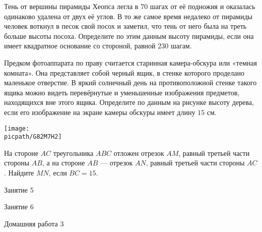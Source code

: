 \begin{homework}[number=2]
	\begin{listofex}
		\item Тень от вершины пирамиды Хеопса легла	в \( 70 \) шагах от её подножия и оказалась	одинаково удалена от двух её углов. В то же самое время недалеко от пирамиды человек воткнул в песок свой посох и	заметил, что тень от него была на треть	больше высоты посоха. Определите по	этим данным высоту пирамиды, если она имеет квадратное основание со стороной, равной \( 230 \) шагам.
		\item Предком фотоаппарата по праву считается старинная камера-обскура или «темная комната». Она представляет собой черный ящик, в стенке которого проделано маленькое отверстие. В яркий солнечный
		день на противоположной стенке такого ящика можно видеть перевёрнутые и	уменьшенные изображения предметов, находящихся вне этого ящика. Определите по данным на рисунке высоту дерева, если его изображение на экране камеры обскуры имеет длину \( 15 \) см.
		\begin{center}
			\texttt{[image: \\picpath/G82M7H2]}
		\end{center}
		\item На стороне \( AC \) треугольника \( ABC \) отложен отрезок \( AM \), равный третьей части стороны \( AB \), а на стороне \( AB \) --- отрезок \( AN \), равный третьей части стороны \( AC \). Найдите \( MN \), если \( BC=15 \).
	\end{listofex}
\end{homework}

\begin{class}[number=5]
	\begin{listofex}
		\item Занятие 5
	\end{listofex}
\end{class}

\begin{class}[number=6]
	\begin{listofex}
		\item Занятие 6
	\end{listofex}
\end{class}

\begin{homework}[number=3]
	\begin{listofex}
		\item Домашняя работа 3
	\end{listofex}
\end{homework}

